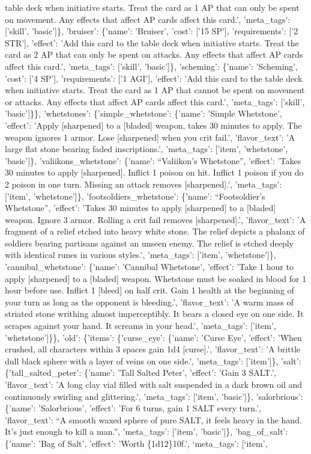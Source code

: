 \documentclass[
  letterpaper,
  DIV=11,
  numbers=noendperiod]{scrartcl}
\begin{document}
{table deck when initiative starts. Treat the card as 1 AP that can only
be spent on movement. Any effects that affect AP cards affect this
card.', 'meta\_tags': {[}'skill', 'basic'{]}\}, 'bruiser': \{'name':
'Bruiser', 'cost': {[}'15 SP'{]}, 'requirements': {[}'2 STR'{]},
'effect': 'Add this card to the table deck when initiative starts. Treat
the card as 2 AP that can only be spent on attacks. Any effects that
affect AP cards affect this card.', 'meta\_tags': {[}'skill',
'basic'{]}\}, 'scheming': \{'name': 'Scheming', 'cost': {[}'4 SP'{]},
'requirements': {[}'1 AGI'{]}, 'effect': 'Add this card to the table
deck when initiative starts. Treat the card as 1 AP that cannot be spent
on movement or attacks. Any effects that affect AP cards affect this
card.', 'meta\_tags': {[}'skill', 'basic'{]}\}\}, 'whetstones':
\{'simple\_whetstone': \{'name': 'Simple Whetstone', 'effect': 'Apply
{[}sharpened{]} to a {[}bladed{]} weapon, takes 30 minutes to apply. The
weapon ignores 1 armor. Lose {[}sharpened{]} when you crit fail.',
'flavor\_text': 'A large flat stone bearing faded inscriptions.',
'meta\_tags': {[}'item', 'whetstone', 'basic'{]}\},
'valiikons\_whetstone': \{'name': ``Valiikon's Whetstone'', 'effect':
'Takes 30 minutes to apply {[}sharpened{]}. Inflict 1 poison on hit.
Inflict 1 poison if you do 2 poison in one turn. Missing an attack
removes {[}sharpened{]}.', 'meta\_tags': {[}'item', 'whetstone'{]}\},
'footsoldiers\_whetstone': \{'name': ``Footsoldier's Whetstone'',
'effect': 'Takes 30 minutes to apply {[}sharpened{]} to a {[}bladed{]}
weapon. Ignore 3 armor. Rolling a crit fail removes {[}sharpened{]}.',
'flavor\_text': 'A fragment of a relief etched into heavy white stone.
The relief depicts a phalanx of soldiers bearing partisans against an
unseen enemy. The relief is etched deeply with identical runes in
various styles.', 'meta\_tags': {[}'item', 'whetstone'{]}\},
'cannibal\_whetstone': \{'name': 'Cannibal Whetstone', 'effect': 'Take 1
hour to apply {[}sharpened{]} to a {[}bladed{]} weapon. Whetstone must
be soaked in blood for 1 hour before use. Inflict 1 {[}bleed{]} on half
crit. Gain 1 health at the beginning of your turn as long as the
opponent is bleeding.', 'flavor\_text': 'A warm mass of striated stone
writhing almost imperceptibly. It bears a closed eye on one side. It
scrapes against your hand. It screams in your head.', 'meta\_tags':
{[}'item', 'whetstone'{]}\}\}, 'old': \{'items': \{'curse\_eye':
\{'name': 'Curse Eye', 'effect': 'When crushed, all characters within 3
spaces gain 1d4 {[}curse{]}.', 'flavor\_text': 'A brittle dull black
sphere with a layer of veins on one side.', 'meta\_tags':
{[}'item'{]}\}, 'salt': \{'tall\_salted\_peter': \{'name': 'Tall Salted
Peter', 'effect': 'Gain 3 SALT.', 'flavor\_text': 'A long clay vial
filled with salt suspended in a dark brown oil and continuously swirling
and glittering.', 'meta\_tags': {[}'item', 'basic'{]}\}, 'salorbrious':
\{'name': 'Salorbrious', 'effect': 'For 6 turns, gain 1 SALT every
turn.', 'flavor\_text': ``A smooth waxed sphere of pure SALT, it feels
heavy in the hand. It's just enough to kill a man.'', 'meta\_tags':
{[}'item', 'basic'{]}\}, 'bag\_of\_salt': \{'name': 'Bag of Salt',
'effect': 'Worth \{1d12\}}10f.', `meta\_tags': {[}`item',
\end{document}
